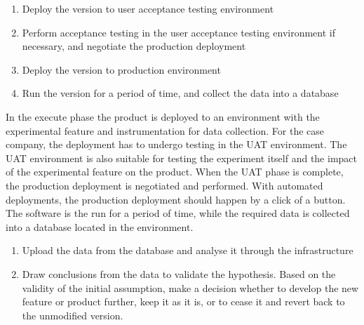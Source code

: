 \documentclass[english, grading]{tktltiki2}
\theoremstyle{definition}
\theoremstyle{remark}
\begin{document}


\begin{enumerate}
  \item Deploy the version to user acceptance testing environment %
  \item Perform acceptance testing in the user acceptance testing environment if necessary, and negotiate the production deployment
  \item Deploy the version to production environment
  \item Run the version for a period of time, and collect the data into a database
  
\end{enumerate}

In the execute phase the product is deployed to an environment with the experimental feature and instrumentation for data collection. For the case company, the deployment has to undergo testing in the UAT environment. The UAT environment is also suitable for testing the experiment itself and the impact of the experimental feature on the product. When the UAT phase is complete, the production deployment is negotiated and performed. With automated deployments, the production deployment should happen by a click of a button. The software is the run for a period of time, while the required data is collected into a database located in the environment. 

\begin{enumerate}
  \item Upload the data from the database and analyse it through the infrastructure
  \item Draw conclusions from the data to validate the hypothesis. Based on the validity of the initial assumption, make a decision whether to develop the new feature or product further, keep it as it is, or to cease it and revert back to the unmodified version. 
\end{enumerate}
\end{document}
